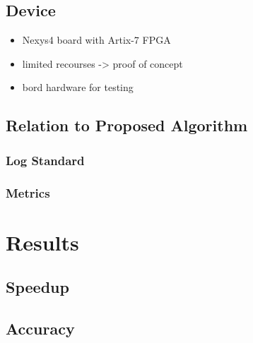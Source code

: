\documentclass[mscthesis]{usiinfthesis}
\begin{document}
\section{Device}
\label{ch:test_dev}

\begin{itemize}
    \item Nexys4 board with Artix-7 FPGA
    \item limited recourses -> proof of concept
    \item bord hardware for testing
\end{itemize}

\section{Relation to Proposed Algorithm}
\label{ch:test_prop}

\subsection{Log Standard}

\subsection{Metrics}

\chapter{Results}
\label{ch:res}
\section{Speedup}
\label{ch:res_speed}
\section{Accuracy}
\label{ch:res_prec}
\end{document}
